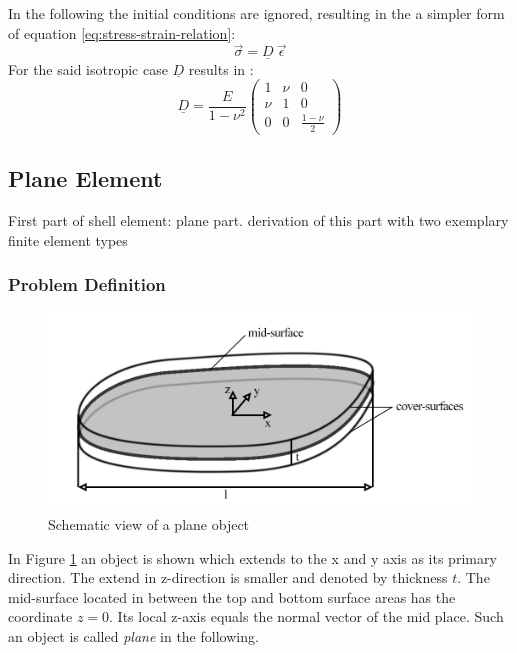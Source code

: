  In the following the initial conditions are ignored, resulting in the a simpler form of equation \ref{eq:stress-strain-relation}:
 \begin{equation}
 \vec{\sigma} = \underline{D}\ \vec{\epsilon}
 \end{equation}
 For the said isotropic case $\underline{D}$ results in \cite{zienkiewicz2000finite}:
 \begin{equation}
 \underline{D} = \frac{E}{1-\nu^2}\begin{pmatrix}
 1 & \nu & 0 \\
 \nu & 1 & 0 \\
 0 & 0 & \frac{1-\nu}{2}
 \end{pmatrix}
 \end{equation}
 
 
 
 
 
 
 
 \subsection{Plane Element}
 First part of shell element: plane part. derivation of this part with two exemplary finite element types
  \subsubsection{Problem Definition}\label{sec:PlaneProbDef}
  \begin{figure}
\centering
\includegraphics[width=0.97\linewidth]{figures/plane}
\caption{Schematic view of a plane object}
\label{fig:plane}
\end{figure}
  In Figure \ref{fig:plane} an object is shown which extends to the x and y axis as its primary direction. The extend in z-direction is smaller and denoted by thickness $t$. The mid-surface located in between the top and bottom surface areas has the coordinate $z=0$. Its local z-axis equals the normal vector of the mid place. Such an object is called \textit{plane} in the following.
  
